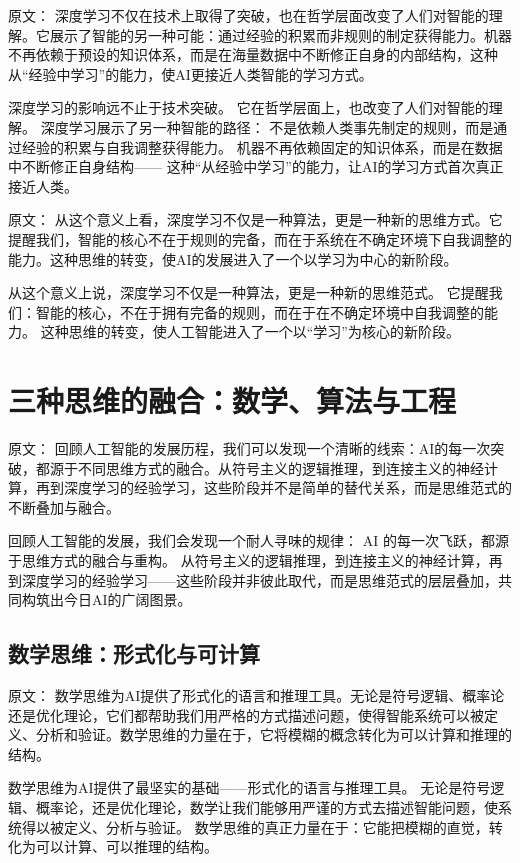 原文：
深度学习不仅在技术上取得了突破，也在哲学层面改变了人们对智能的理解。它展示了智能的另一种可能：通过经验的积累而非规则的制定获得能力。机器不再依赖于预设的知识体系，而是在海量数据中不断修正自身的内部结构，这种从“经验中学习”的能力，使AI更接近人类智能的学习方式。

深度学习的影响远不止于技术突破。  
它在哲学层面上，也改变了人们对智能的理解。  
深度学习展示了另一种智能的路径：  
不是依赖人类事先制定的规则，而是通过经验的积累与自我调整获得能力。  
机器不再依赖固定的知识体系，而是在数据中不断修正自身结构——  
这种“从经验中学习”的能力，让AI的学习方式首次真正接近人类。

原文：
从这个意义上看，深度学习不仅是一种算法，更是一种新的思维方式。它提醒我们，智能的核心不在于规则的完备，而在于系统在不确定环境下自我调整的能力。这种思维的转变，使AI的发展进入了一个以学习为中心的新阶段。

从这个意义上说，深度学习不仅是一种算法，更是一种新的思维范式。  
它提醒我们：智能的核心，不在于拥有完备的规则，而在于在不确定环境中自我调整的能力。  
这种思维的转变，使人工智能进入了一个以“学习”为核心的新阶段。

\section{三种思维的融合：数学、算法与工程}

原文：
回顾人工智能的发展历程，我们可以发现一个清晰的线索：AI的每一次突破，都源于不同思维方式的融合。从符号主义的逻辑推理，到连接主义的神经计算，再到深度学习的经验学习，这些阶段并不是简单的替代关系，而是思维范式的不断叠加与融合。

回顾人工智能的发展，我们会发现一个耐人寻味的规律：  
AI 的每一次飞跃，都源于思维方式的融合与重构。  
从符号主义的逻辑推理，到连接主义的神经计算，再到深度学习的经验学习——这些阶段并非彼此取代，而是思维范式的层层叠加，共同构筑出今日AI的广阔图景。

\subsection{数学思维：形式化与可计算}

原文：
数学思维为AI提供了形式化的语言和推理工具。无论是符号逻辑、概率论还是优化理论，它们都帮助我们用严格的方式描述问题，使得智能系统可以被定义、分析和验证。数学思维的力量在于，它将模糊的概念转化为可以计算和推理的结构。

数学思维为AI提供了最坚实的基础——形式化的语言与推理工具。  
无论是符号逻辑、概率论，还是优化理论，数学让我们能够用严谨的方式去描述智能问题，使系统得以被定义、分析与验证。  
数学思维的真正力量在于：它能把模糊的直觉，转化为可以计算、可以推理的结构。

